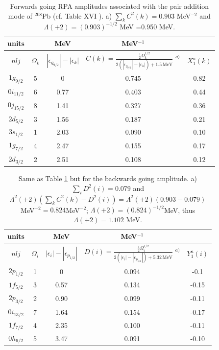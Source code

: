 \begin{table}
\begin{tabular}{|c|c|c|c|c|}
\hline units &  &MeV  &MeV$^{-1}$  &    \\ 
\hline  $nlj$&$\Omega_k$  &$|\epsilon_{g_{9/2}}|-|\epsilon_k|$  &$C(k)=\frac{\frac{1}{2}\Omega_k^{1/2}}{2(|\epsilon_{g_{9/2}}|-|\epsilon_k|)+1.5\,\text{MeV}}$  $\vphantom{\prod}^{a)}$& $X_1^a(k)$  \\ 
\hline  $1g_{9/2}$& 5 &  0& 0.745 &  0.82\\ 
\hline $0i_{11/2}$ & 6 &  0.77&0.403  & 0.44  \\ 
\hline  $0j_{15/2}$& 8 &  1.41&  0.327&  0.36\\ 
\hline  $2d_{5/2}$& 3 & 1.56 & 0.187 & 0.21 \\ 
\hline  $3s_{1/2}$&  1& 2.03 &  0.090& 0.10\\ 
\hline  $1g_{7/2}$&  4& 2.47 & 0.155 &  0.17  \\ 
\hline  $2d_{3/2}$&  2& 2.51 & 0.108 &  0.12 \\ 
\hline 
\end{tabular}\caption{Forwards going RPA amplitudes associated with the pair addition mode of $^{208}$Pb (cf.  Table XVI \cite{Broglia:73}). a) $\sum_{k}C^2(k)=0.903$ MeV$^{-2}$ and $\Lambda(+2)=(0.903)^{-1/2}$ MeV =0.950 MeV.}\label{tab1E4}
\end{table}
\begin{table}
\begin{tabular}{|c|c|c|c|c|}
\hline units &  &MeV  &MeV$^{-1}$  &    \\ 
\hline  $nlj$&$\Omega_i$  &$|\epsilon_i|-|\epsilon_{p_{1/2}}|$  &$D(i)=\frac{\frac{1}{2}\Omega_i^{1/2}}{2(|\epsilon_i|-|\epsilon_{p_{1/2}}|)+5.32\,\text{MeV}}$ $^{a)}$ & $Y_1^a(i)$  \\ 
\hline  $2p_{1/2}$& 1 &  0& 0.094 &  -0.1\\ 
\hline $1f_{5/2}$ & 3 &  0.57& 0.134  & -0.15 \\ 
\hline  $2p_{3/2}$& 2 &  0.90&  0.099&  -0.11\\ 
\hline  $0i_{13/2}$& 7 & 1.64 & 0.154 & -0.17 \\ 
\hline  $1f_{7/2}$&  4& 2.35 &  0.100& -0.11 \\ 
\hline  $0h_{9/2}$&  5& 3.47 & 0.091 &  -0.10  \\ 
\hline 
\end{tabular}\caption{Same as Table \ref{tab1E4} but for the backwards going amplitude. a) $\sum_i D^2(i)=0.079$ and $\Lambda^2(+2) (\sum_k C^2(k)-D^2(i))=\Lambda^2(+2) (0.903-0.079)$ MeV$^{-2}=0.824$MeV$^{-2}$; $\Lambda(+2)=(0.824)^{-1/2}$MeV, thus $\Lambda(+2)=1.102$ MeV.}\label{tab1E5}
\end{table}

